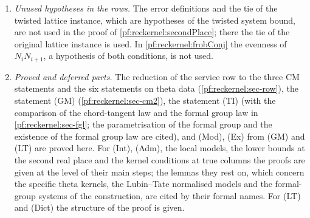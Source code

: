 \begin{enumerate}
  $\eps_1=1$ and the trivial threshold: for an $\mathrm{LM}$-selection the twisted-system condition holds for every
  member of the class, eventually in $x$, without any largeness of the family constants. Similarly, the kernel
  conditions in the service row hold at all selected bundles (\cref{pf:reckernel:pdv}); the closed form used in the
  package is obtained by reusing the thresholds of the first component (\cref{pf:reckernel:kerServ}).
\item \emph{Unused hypotheses in the rows.} The error definitions and the tie of the twisted lattice instance, which
  are hypotheses of the twisted system bound, are not used in the proof of \cref{pf:reckernel:secondPlace}; there the tie
  of the original lattice instance is used. In \cref{pf:reckernel:frobConj} the evenness of $N_iN_{i+1}$, a hypothesis
  of both conditions, is not used.
\item \emph{Proved and deferred parts.} The reduction of the service row to the three CM statements and the six
  statements on theta data (\cref{pf:reckernel:sec-row}), the statement (GM) (\cref{pf:reckernel:sec-cm2}), the statement
  (TI) (with the comparison of the chord-tangent law and the formal group law in \cref{pf:reckernel:sec-fgl}; the
  parametrisation of the formal group and the existence of the formal group law are cited), and (Mod), (Ex) from (GM)
  and (LT) are proved here. For (Int), (Adm), the local models, the lower bounds at the second real place and the kernel
  conditions at true columns the proofs are given at the level of their main steps; the lemmas they rest on, which
  concern the specific theta kernels, the Lubin--Tate normalised models and the formal-group systems of the
  construction, are cited by their formal names. For (LT) and (Dict) the structure of the proof is given.
\end{enumerate}
